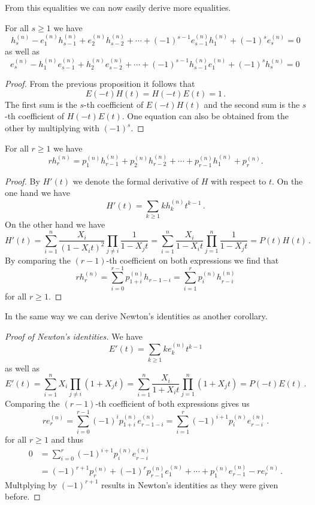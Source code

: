 From this equalities we can now easily derive more equalities.


\begin{corollary}
  For all $s \geq 1$ we have
  \[
        h^{(n)}_s
      - e^{(n)}_1 h^{(n)}_{s-1}
      + e^{(n)}_2 h^{(n)}_{s-2}
      + \dotsb
      + (-1)^{s-1} e^{(n)}_{s-1} h^{(n)}_1
      + (-1)^s e^{(n)}_s
    = 0
  \]
  as well as
  \[
        e^{(n)}_s
      - h^{(n)}_1 e^{(n)}_{s-1}
      + h^{(n)}_2 e^{(n)}_{s-2}
      + \dotsb
      + (-1)^{s-1} h^{(n)}_{s-1} e^{(n)}_1
      + (-1)^s h^{(n)}_s
    = 0 \,
  \]
\end{corollary}
\begin{proof}
  From the previous proposition it follows that
  \[
      E(-t)H(t)
    = H(-t)E(t) = 1 \,.
  \]
  The first sum is the $s$-th coefficient of $E(-t)H(t)$ and the second sum is the $s$-th coefficient of $H(-t)E(t)$.
  One equation can also be obtained from the other by multiplying with $(-1)^s$.
\end{proof}


\begin{corollary}
  For all $r \geq 1$ we have
  \[
      r h^{(n)}_r
    =   p^{(n)}_1 h^{(n)}_{r-1}
      + p^{(n)}_2 h^{(n)}_{r-2}
      + \dotsb
      + p^{(n)}_{r-1} h^{(n)}_1
      + p^{(n)}_r.
  \]
\end{corollary}
\begin{proof}
  By $H'(t)$ we denote the formal derivative of $H$ with respect to $t$.
  On the one hand we have
  \[
      H'(t)
    = \sum_{k \geq 1} k h^{(n)}_k t^{k-1} \,.
  \]
  On the other hand we have
  \[
      H'(t)
    = \sum_{i=1}^n \frac{X_i}{(1-X_i t)^2} \prod_{j \neq i} \frac{1}{1 - X_j t}
    = \sum_{i=1}^n \frac{X_i}{1 - X_i t} \prod_{j=1}^n \frac{1}{1 - X_j t}
    = P(t) H(t) \,.
  \]
  By comparing the $(r-1)$-th coefficient on both expressions we find that
  \[
      r h^{(n)}_r
    = \sum_{i=0}^{r-1} p^{(n)}_{1+i} h_{r-1-i}
    = \sum_{i=1}^r p^{(n)}_i h^{(n)}_{r-i}
  \]
  for all $r \geq 1$.
\end{proof}


In the same way we can derive Newton’s identities as another corollary.


\begin{proof}[Proof of Newton’s identities]
  We have
  \[
      E'(t)
    = \sum_{k \geq 1} k e^{(n)}_k t^{k-1}
  \]
  as well as
  \[
      E'(t)
    = \sum_{i=1}^n X_i \prod_{j \neq i} (1 + X_j t)
    = \sum_{i=1}^n \frac{X_i}{1 + X_i t} \prod_{j=1}^n (1 + X_j t)
    = P(-t)E(t) \,.
  \]
  Comparing the $(r-1)$-th coefficient of both expressions gives us
  \[
      r e^{(n)}_r
    = \sum_{i=0}^{r-1} (-1)^i p^{(n)}_{1+i} e^{(n)}_{r-1-i}
    = \sum_{i=1}^r (-1)^{i+1} p^{(n)}_i e^{(n)}_{r-i} \,.
  \]
  for all $r \geq 1$ and thus
  \begin{align*}
        0
    &=  \sum_{i=0}^r (-1)^{i+1} p^{(n)}_i e^{(n)}_{r-i} \\
    &=  (-1)^{r+1} p^{(n)}_r + (-1)^r p^{(n)}_{r-1} e^{(n)}_1 + \dotsb + p^{(n)}_1 e^{(n)}_{r-1} - r e^{(n)}_r \,.
  \end{align*}
  Multplying by $(-1)^{r+1}$ results in Newton’s identities as they were given before.
\end{proof}



